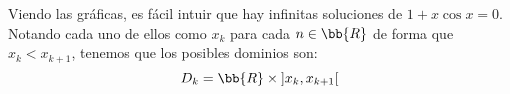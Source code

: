\documentclass[12pt]{article}
\begin{document}
\begin{ejercicio}
\begin{enumerate}
\begin{comment}
                Tenemos que $f(\pi k)=1+\pi k>0$. 
            \end{itemize}
        \end{comment}

        Viendo las gráficas, es fácil intuir que hay infinitas soluciones de $1+x\cos x=0$. Notando cada uno de ellos como $x_k$ para cada $n\in \bb{R}$ de forma que $x_k<x_{k+1}$, tenemos que los posibles dominios son:
        \begin{equation*}
            D_k=\bb{R}\times \left]x_k,x_{k+1}\right[
        \end{equation*}
        \end{enumerate}
    \end{ejercicio}
\end{document}
